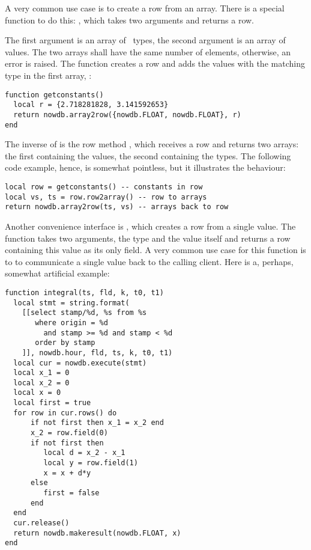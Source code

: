 A very common use case is to create a row from
an array. There is a special function to do this:
, which takes two arguments
and returns a row.

The first argument is an array of \nowdb\ types,
the second argument is an array of values.
The two arrays shall have the same number
of elements, otherwise, an error is raised.
The function creates a row and adds the values
with the matching type in the first array, \eg:

\begin{lua}
\begin{lstlisting}
function getconstants()
  local r = {2.718281828, 3.141592653}
  return nowdb.array2row({nowdb.FLOAT, nowdb.FLOAT}, r)
end
\end{lstlisting}
\end{lua}

The inverse of  is the row method
, which receives a row and returns
two arrays: the first containing the values,
the second containing the types.
The following code example, hence, is
somewhat pointless, but it illustrates the
behaviour:

\begin{lua}
\begin{lstlisting}
local row = getconstants() -- constants in row
local vs, ts = row.row2array() -- row to arrays
return nowdb.array2row(ts, vs) -- arrays back to row
\end{lstlisting}
\end{lua}

Another convenience interface is ,
which creates a row from a single value. The function
takes two arguments, the type and the value itself
and returns a row containing this value as its
only field. A very common use case for this function is to
to communicate a single value back to the calling client.
Here is a, perhaps, somewhat artificial example:

\begin{lua}
\begin{lstlisting}
function integral(ts, fld, k, t0, t1)
  local stmt = string.format(
    [[select stamp/%d, %s from %s
       where origin = %d
         and stamp >= %d and stamp < %d
       order by stamp
    ]], nowdb.hour, fld, ts, k, t0, t1)
  local cur = nowdb.execute(stmt)
  local x_1 = 0
  local x_2 = 0
  local x = 0
  local first = true
  for row in cur.rows() do
      if not first then x_1 = x_2 end
      x_2 = row.field(0)
      if not first then
         local d = x_2 - x_1
         local y = row.field(1)
         x = x + d*y
      else
         first = false
      end
  end
  cur.release()
  return nowdb.makeresult(nowdb.FLOAT, x)
end
\end{lstlisting}
\end{lua}

